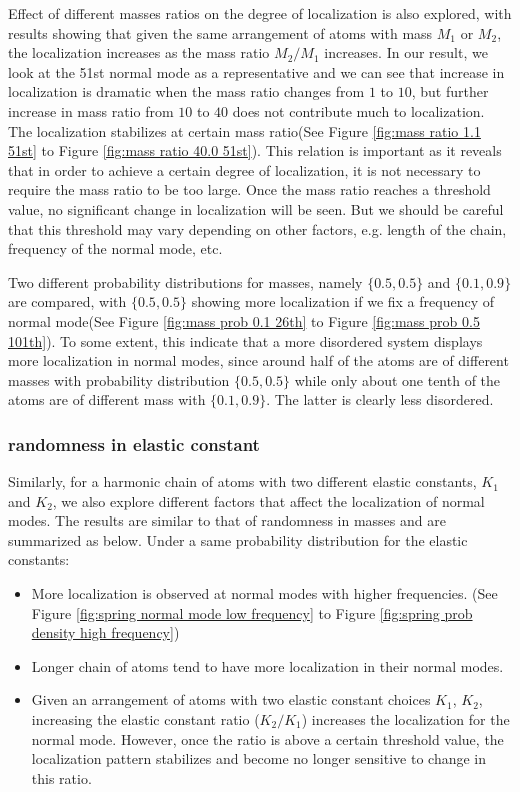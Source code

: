 Effect of different masses ratios on the degree of localization is also explored, with results showing that given the same arrangement of atoms with mass $M_1$ or $M_2$, the localization increases as the mass ratio $M_2/M_1$ increases. In our result, we look at the 51st normal mode as a representative and we can see that increase in localization is dramatic when the mass ratio changes from $1$ to $10$, but further increase in mass ratio from $10$ to $40$ does not contribute much to localization. The localization stabilizes at certain mass ratio(See Figure \ref{fig:mass ratio 1.1 51st} to Figure \ref{fig:mass ratio 40.0 51st}). This relation is important as it reveals that in order to achieve a certain degree of localization, it is not necessary to require the mass ratio to be too large. Once the mass ratio reaches a threshold value, no significant change in localization will be seen. But we should be careful that this threshold may vary depending on other factors, e.g. length of the chain, frequency of the normal mode, etc. 

Two different probability distributions for masses, namely $\{0.5,0.5\}$ and $\{0.1,0.9\}$ are compared, with $\{0.5,0.5\}$  showing more localization if we fix a frequency of normal mode(See Figure \ref{fig:mass prob 0.1 26th} to Figure \ref{fig:mass prob 0.5 101th}). To some extent, this indicate that a more disordered system displays more localization in normal modes, since around half of the atoms are of different masses with probability distribution $\{0.5, 0.5\}$ while only about one tenth of the atoms are of different mass with $\{0.1, 0.9\}$. The latter is clearly less disordered. 

\subsubsection{randomness in elastic constant}

Similarly, for a harmonic chain of atoms with two different elastic constants, $K_1$ and $K_2$, we also explore different factors that affect the localization of normal modes. The results are similar to that of randomness in masses and are summarized as below. 
Under a same probability distribution for the elastic constants: 
\begin{itemize}
\item 
More localization is observed at normal modes with higher frequencies. (See Figure \ref{fig:spring normal mode low frequency} to Figure \ref{fig:spring prob density high frequency})
\item
Longer chain of atoms tend to have more localization in their normal modes.
\item
Given an arrangement of atoms with two elastic constant choices $K_1$, $K_2$, increasing the elastic constant ratio ($K_2/K_1$) increases the localization for the normal mode. However, once the ratio is above a certain threshold value, the localization pattern stabilizes and become no longer sensitive to change in this ratio. 
\end{itemize}

